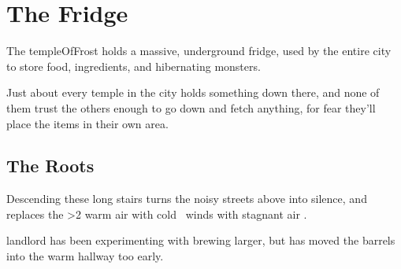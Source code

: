 \section{The Fridge}

\begin{multicols}{2}

\noindent
The \gls{templeOfFrost} holds a massive, underground fridge, used by the entire city to store food, \glspl{ingredient}, and hibernating \glspl{monster}.

Just about every \gls{temple} in the city holds something down there, and none of them trust the others enough to go down and fetch anything, for fear they'll place the items in their own area.

\renewcommand\csComments{
  \callout{12,21}{0,0}{\ref{fStairs}:~\nameref{fStairs}}{}
  \callout[12]{12,18}{0,0.5}{\ref{fHallStore}:~\nameref{fHallStore}}{}
  \callout[10]{18,5}{-2,-2}{\ref{fCheeseStorage}:~\nameref{fCheeseStorage}}{}
  \callout[10]{10,15}{0,0}{\ref{fLift}:~\nameref{fLift}}{}
  \callout[10]{17,20}{-1,0}{\ref{fWheat}:~\nameref{fWheat}}{}
  \callout[10]{17,18}{-1,0}{\ref{fIngStore}:~\nameref{fIngStore}}{}
  \callout[10]{1,22}{2,-1}{\ref{fOffice}:~\nameref{fOffice}}{Everything entered must be registered}
  \callout[14]{2,17}{2,0}{\ref{fDip}:~\nameref{fDip}}{with oil barrels}
  \callout[10]{1,14}{2,-1}{\ref{fSide}:~\nameref{fSide}}{}
  \callout{12,16}{1,0}{Secrets}{}
  \callout{6,11}{4,0}{\ref{fBoat}:~\nameref{fBoat}}{there's a boat}
  \callout[10]{7,0}{0,2.5}{\ref{fGuardDoor}/ \ref{fCrossbow}:~\nameref{fGuardDoor}}{}
  \callout[10]{5,1}{0,0}{\ref{fHibernation}:~\nameref{fHibernation}}{}
  \callout[10]{12,1}{0,0}{\ref{fWeaponStore}:~\nameref{fWeaponStore}}{}
}


\subsection{The Roots}


Descending these long stairs turns the noisy streets above into silence, and replaces the
\ifnum\value{temperature}>2%
  warm air with cold%
\else%
  \showTemperature\ winds with stagnant air%
\fi.

\begin{exampletext}
   \gls{landlord} has been experimenting with brewing larger, but has moved the barrels into the warm hallway too early.
\end{exampletext}


\end{multicols}
